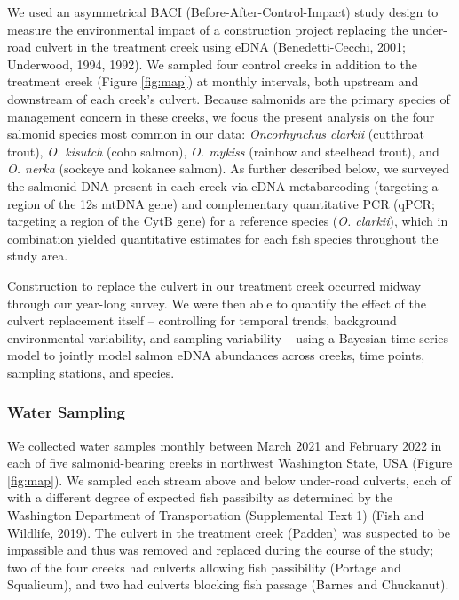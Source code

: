 \documentclass[
]{article}
\begin{document}
We used an asymmetrical BACI (Before-After-Control-Impact) study design
to measure the environmental impact of a construction project replacing
the under-road culvert in the treatment creek using eDNA
(Benedetti-Cecchi, 2001; Underwood, 1994, 1992). We sampled four control
creeks in addition to the treatment creek (Figure \ref{fig:map}) at
monthly intervals, both upstream and downstream of each creek's culvert.
Because salmonids are the primary species of management concern in these
creeks, we focus the present analysis on the four salmonid species most
common in our data: \emph{Oncorhynchus clarkii} (cutthroat trout),
\emph{O. kisutch} (coho salmon), \emph{O. mykiss} (rainbow and steelhead
trout), and \emph{O. nerka} (sockeye and kokanee salmon). As further
described below, we surveyed the salmonid DNA present in each creek via
eDNA metabarcoding (targeting a region of the 12s mtDNA gene) and
complementary quantitative PCR (qPCR; targeting a region of the CytB
gene) for a reference species (\emph{O. clarkii}), which in combination
yielded quantitative estimates for each fish species throughout the
study area.

Construction to replace the culvert in our treatment creek occurred
midway through our year-long survey. We were then able to quantify the
effect of the culvert replacement itself -- controlling for temporal
trends, background environmental variability, and sampling variability
-- using a Bayesian time-series model to jointly model salmon eDNA
abundances across creeks, time points, sampling stations, and species.

\hypertarget{water-sampling}{%
\subsubsection{Water Sampling}\label{water-sampling}}

We collected water samples monthly between March 2021 and February 2022
in each of five salmonid-bearing creeks in northwest Washington State,
USA (Figure \ref{fig:map}). We sampled each stream above and below
under-road culverts, each of with a different degree of expected fish
passibilty as determined by the Washington Department of Transportation
(Supplemental Text 1) (Fish and Wildlife, 2019). The culvert in the
treatment creek (Padden) was suspected to be impassible and thus was
removed and replaced during the course of the study; two of the four
creeks had culverts allowing fish passibility (Portage and Squalicum),
and two had culverts blocking fish passage (Barnes and Chuckanut).
\end{document}
